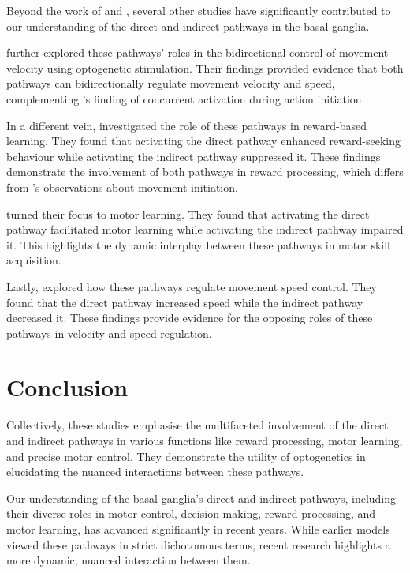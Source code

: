 \documentclass[10pt]{article}
\begin{document}
\begin{sloppypar}
  Beyond the work of \cite{cui_concurrent_2013} and \cite{kravitz_regulation_2010}, several other studies have significantly contributed to our understanding of the direct and indirect pathways in the basal ganglia.

  \cite{yttri_opponent_2016} further explored these pathways’ roles in the bidirectional control of movement velocity using optogenetic stimulation. Their findings provided evidence that both pathways can bidirectionally regulate movement velocity and speed, complementing \cite{cui_concurrent_2013} ’s finding of concurrent activation during action initiation.

  In a different vein, \cite{guillaumin_experimental_2021} investigated the role of these pathways in reward-based learning. They found that activating the direct pathway enhanced reward-seeking behaviour while activating the indirect pathway suppressed it. These findings demonstrate the involvement of both pathways in reward processing, which differs from \cite{cui_concurrent_2013} ’s observations about movement initiation.

  \cite{hilt_evidence_2016} turned their focus to motor learning. They found that activating the direct pathway facilitated motor learning while activating the indirect pathway impaired it. This highlights the dynamic interplay between these pathways in motor skill acquisition.

  Lastly, \cite{wang_direct_2015} explored how these pathways regulate movement speed control. They found that the direct pathway increased speed while the indirect pathway decreased it. These findings provide evidence for the opposing roles of these pathways in velocity and speed regulation.

  \section{Conclusion}
  \label{sec:conclusion}

  Collectively, these studies emphasise the multifaceted involvement of the direct and indirect pathways in various functions like reward processing, motor learning, and precise motor control. They demonstrate the utility of optogenetics in elucidating the nuanced interactions between these pathways.

  Our understanding of the basal ganglia’s direct and indirect pathways, including their diverse roles in motor control, decision-making, reward processing, and motor learning, has advanced significantly in recent years. While earlier models viewed these pathways in strict dichotomous terms, recent research highlights a more dynamic, nuanced interaction between them.


\end{sloppypar}
\end{document}
